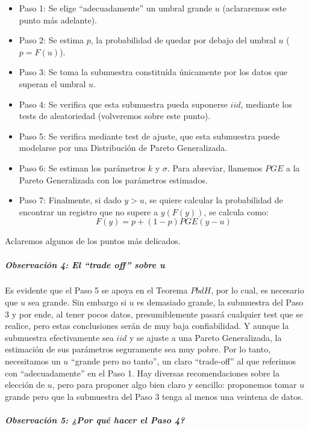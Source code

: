 \documentclass[
  12pt]{article}
\begin{document}
\begin{itemize}
\item Paso 1: Se elige “adecuadamente” un umbral grande $u$ (aclararemos este punto más adelante).
\item Paso 2: Se estima $p$, la probabilidad de quedar por debajo del umbral $u$ ($p=F(u)$).
\item Paso 3: Se toma la submuestra constituída únicamente por los datos que superan el umbral $u$.
\item Paso 4: Se verifica que esta submuestra pueda suponerse $iid$, mediante los tests de aleatoriedad (volveremos sobre este punto).
\item Paso 5: Se verifica mediante test de ajuste, que esta submuestra puede modelarse por una Distribución de Pareto Generalizada.
\item Paso 6: Se estiman los parámetros $k$ y $\sigma$. Para abreviar, llamemos $PGE$ a la Pareto Generalizada con los parámetros estimados.
\item Paso 7: Finalmente, si dado $y >u$, se quiere calcular la probabilidad de encontrar un registro que no supere a $y (F(y))$, se calcula como:
\begin{equation}
F(y)=p +(1-p)PGE(y-u)
\end{equation}
\end{itemize}

Aclaremos algunos de los puntos más delicados.

\subparagraph{Observación 4: El ``trade off'' sobre
u}\label{observaciuxf3n-4-el-trade-off-sobre-u}

Es evidente que el Paso 5 se apoya en el Teorema \(PbdH\), por lo cual,
es necesario que \(u\) sea grande. Sin embargo si \(u\) es demasiado
grande, la submuestra del Paso 3 y por ende, al tener pocos datos,
presumiblemente pasará cualquier test que se realice, pero estas
conclusiones serán de muy baja confiabilidad. Y aunque la submuestra
efectivamente sea \(iid\) y se ajuste a una Pareto Generalizada, la
estimación de sus parámetros seguramente sea muy pobre. Por lo tanto,
necesitamos un \(u\) ``grande pero no tanto'', un claro ``trade-off'' al
que referimos con ``adecuadamente'' en el Paso 1. Hay diversas
recomendaciones sobre la elección de \(u\), pero para proponer algo bien
claro y sencillo: proponemos tomar \(u\) grande pero que la submuestra
del Paso 3 tenga al menos una veintena de datos.

\subparagraph{Observación 5: ¿Por qué hacer el Paso
4?}\label{observaciuxf3n-5-por-quuxe9-hacer-el-paso-4}
\end{document}

